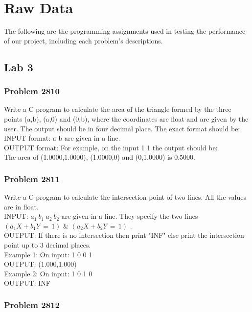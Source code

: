 \chapter{Raw Data}
The following are the programming assignments used in testing the performance of our project,
including each problem's descriptions.

\section{Lab 3}

\subsection{Problem 2810}

Write a C program to calculate the area of the triangle formed by the three points (a,b), (a,0) and (0,b), where the coordinates are float and are given by the user. The output should be in four decimal place. The exact format should be:
\\INPUT format: a b are given in a line.
\\OUTPUT format: For example, on the input 1 1 the output should be:
\\The area of (1.0000,1.0000), (1.0000,0) and (0,1.0000) is 0.5000.

\subsection{Problem 2811}

Write a C program to calculate the intersection point of two lines. All the values are in float.
\\INPUT: $a_1 \: b_1\: a_2\: b_2$ are given in a line. They specify the two lines $(a_1 X + b_1 Y \,=\, 1 )$ \& $(a_2 X + b_2 Y \,=\, 1 )$ .
\\OUTPUT: If there is no intersection then print "INF" else print the intersection point up to 3 decimal places.
\\Example 1: On input: 1 0 0 1
\\OUTPUT: (1.000,1.000)
\\Example 2: On input: 1 0 1 0
\\OUTPUT: INF

\subsection{Problem 2812}

